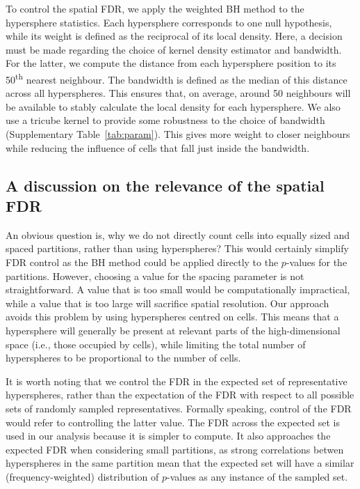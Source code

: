 \documentclass{article}
\begin{document}
To control the spatial FDR, we apply the weighted BH method to the hypersphere statistics.
Each hypersphere corresponds to one null hypothesis, while its weight is defined as the reciprocal of its local density.
Here, a decision must be made regarding the choice of kernel density estimator and bandwidth.
For the latter, we compute the distance from each hypersphere position to its 50\textsuperscript{th} nearest neighbour.
The bandwidth is defined as the median of this distance across all hyperspheres.
This ensures that, on average, around 50 neighbours will be available to stably calculate the local density for each hypersphere.
We also use a tricube kernel to provide some robustness to the choice of bandwidth (Supplementary Table~\ref{tab:param}).
This gives more weight to closer neighbours while reducing the influence of cells that fall just inside the bandwidth.


\subsection{A discussion on the relevance of the spatial FDR}
An obvious question is, why we do not directly count cells into equally sized and spaced partitions, rather than using hyperspheres?
This would certainly simplify FDR control as the BH method could be applied directly to the $p$-values for the partitions.
However, choosing a value for the spacing parameter is not straightforward.
A value that is too small would be computationally impractical, while a value that is too large will sacrifice spatial resolution.
Our approach avoids this problem by using hyperspheres centred on cells.
This means that a hypersphere will generally be present at relevant parts of the high-dimensional space (i.e., those occupied by cells), while limiting the total number of hyperspheres to be proportional to the number of cells.

It is worth noting that we control the FDR in the expected set of representative hyperspheres, rather than the expectation of the FDR with respect to all possible sets of randomly sampled representatives.
Formally speaking, control of the FDR would refer to controlling the latter value.
The FDR across the expected set is used in our analysis because it is simpler to compute.
It also approaches the expected FDR when considering small partitions, as strong correlations betwen hyperspheres in the same partition mean that the expected set will have a similar (frequency-weighted) distribution of $p$-values as any instance of the sampled set.
\end{document}
